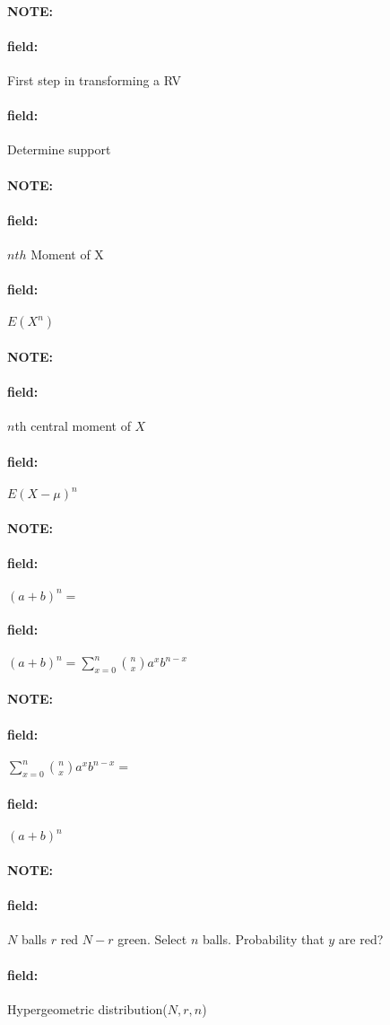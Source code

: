 \documentclass[12pt]{article}
\newenvironment{note}{\paragraph{NOTE:}}{}
\newenvironment{field}{\paragraph{field:}}{}
\begin{document}
\begin{note}
  \begin{field}
    First step in transforming a RV
  \end{field}
  \begin{field}
    Determine support
  \end{field}
\end{note}

\begin{note}
  \begin{field}
    $nth$ Moment of X
  \end{field}
  \begin{field}
    $E(X^n)$
  \end{field}
\end{note}

\begin{note}
  \begin{field}
    $n$th central moment of $X$
  \end{field}
  \begin{field}
    $E(X - \mu)^n$
  \end{field}
\end{note}

\begin{note}
  \begin{field}
    $(a + b)^n = $
  \end{field}
  \begin{field}
    $(a + b)^n = \sum_{x = 0}^n \binom{n}{x}a^xb^{n-x}$
  \end{field}
\end{note}

\begin{note}
  \begin{field}
    $\sum_{x = 0}^n \binom{n}{x}a^xb^{n-x} = $
  \end{field}
  \begin{field}
    $(a + b)^n$
  \end{field}
\end{note}

\begin{note}
  \begin{field}
    $N$ balls $r$ red $N - r$ green. Select $n$ balls. Probability that $y$ are red?
  \end{field}
  \begin{field}
    Hypergeometric distribution($N,r,n$)
  \end{field}
\end{note}
\end{document}
